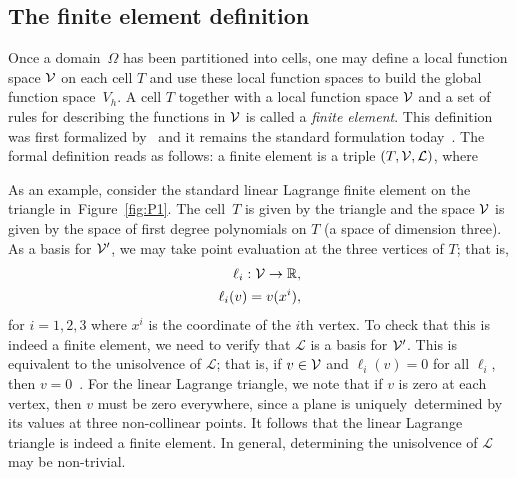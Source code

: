 
\enlargethispage{-5pt}
\vspace*{4pt}
\subsection{The finite element definition}

Once a domain~$\Omega$ has been partitioned into cells, one may define
a local function space $\mathcal{V}$ on each cell $T$ and use these
local function spaces to build the global function space~$V_h$. A cell
$T$ together with a local function space $\mathcal{V}$ and a set of
rules for describing the functions in $\mathcal{V}$ is called a
\emph{finite element}. This definition was first
formalized by~\citet{Ciarlet1976} and it remains the standard
formulation today~\citep{BrennerScott2008}. The formal definition
reads as follows: a finite element is a triple $(T,
\mathcal{V}, \mathcal{L})$, where
\femdefinition{}

As an example, consider the standard linear Lagrange finite element on
the triangle in~Figure~\ref{fig:P1}. The cell~$T$ is given by the
triangle and the space $\mathcal{V}$ is given by the space of first
degree polynomials on $T$ (a space of dimension three). As a basis for
$\mathcal{V}'$, we may take point evaluation at the three vertices
of $T$; that is,
\begin{equation}
  \begin{split}
    \ell_i : \mathcal{V} \rightarrow \mathbb{R},
    \\
    \ell_i(v) = v(x^i),
  \end{split}
\end{equation}
for $i=1,2,3$ where $x^i$ is the coordinate of the $i$th vertex. To
check that this is indeed a finite element, we need to verify that
$\mathcal{L}$ is a basis for $\mathcal{V}'$. This is equivalent to
the unisolvence of $\mathcal{L}$; that is, if $v\in\mathcal{V}$ and
$\ell_i(v) = 0$ for all $\ell_i$, then $v =
0$~\citep{BrennerScott2008}. For the linear Lagrange triangle, we note
that if $v$ is zero at each vertex, then $v$ must be zero everywhere,
since a plane is uniquely~determined by its values at three
non-collinear points. It follows that the linear Lagrange triangle is
indeed a finite element. In general, determining the unisolvence of
$\mathcal{L}$ may be non-trivial.


